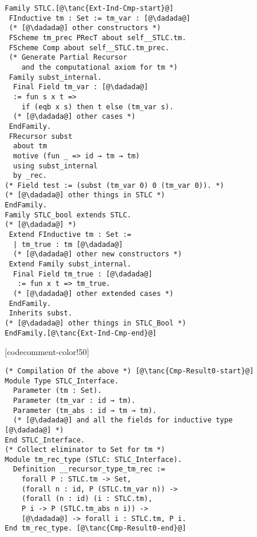 \begin{figure}

\begin{minipage}{\textwidth}
\begin{multicols}{2}


\begin{lstlisting}
Family STLC.[@\tanc{Ext-Ind-Cmp-start}@]
 FInductive tm : Set := tm_var : [@\dadada@]
 (* [@\dadada@] other constructors *) 
 FScheme tm_prec PRecT about self__STLC.tm.
 FScheme Comp about self__STLC.tm_prec.
 (* Generate Partial Recursor 
    and the computational axiom for tm *)
 Family subst_internal. 
  Final Field tm_var : [@\dadada@]
  := fun s x t => 
    if (eqb x s) then t else (tm_var s).
  (* [@\dadada@] other cases *)
 EndFamily.
 FRecursor subst 
  about tm 
  motive (fun _ => id → tm → tm)
  using subst_internal
  by _rec.
(* Field test := (subst (tm_var 0) 0 (tm_var 0)). *)
(* [@\dadada@] other things in STLC *)
EndFamily.
Family STLC_bool extends STLC.
(* [@\dadada@] *)
 Extend FInductive tm : Set :=
  | tm_true : tm [@\dadada@]
  (* [@\dadada@] other new constructors *)
 Extend Family subst_internal.
  Final Field tm_true : [@\dadada@]
   := fun x t => tm_true.
  (* [@\dadada@] other extended cases *)
 EndFamily. 
 Inherits subst.
(* [@\dadada@] other things in STLC_Bool *)
EndFamily.[@\tanc{Ext-Ind-Cmp-end}@]
\end{lstlisting}

[codecomment-color!50]
\vspace{-3pt}



\begin{lstlisting}
(* Compilation Of the above *) [@\tanc{Cmp-Result0-start}@]
Module Type STLC_Interface. 
  Parameter (tm : Set).
  Parameter (tm_var : id → tm).
  Parameter (tm_abs : id → tm → tm).
  (* [@\dadada@] and all the fields for inductive type [@\dadada@] *)
End STLC_Interface.
(* Collect eliminator to Set for tm *)
Module tm_rec_type (STLC: STLC_Interface).
  Definition __recursor_type_tm_rec :=
    forall P : STLC.tm -> Set,
    (forall n : id, P (STLC.tm_var n)) ->
    (forall (n : id) (i : STLC.tm),
    P i -> P (STLC.tm_abs n i)) ->
    [@\dadada@] -> forall i : STLC.tm, P i.
End tm_rec_type. [@\tanc{Cmp-Result0-end}@]
\end{lstlisting}


\end{multicols}
\end{minipage}
\end{figure}
